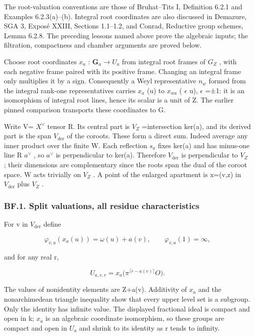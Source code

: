 \documentclass[
  11pt,
]{article}
\begin{document}
The root-valuation conventions are those of Bruhat--Tits I, Definition
6.2.1 and Examples 6.2.3(a)--(b). Integral root coordinates are also
discussed in Demazure, SGA 3, Exposé XXIII, Sections 1.1--1.2, and
Conrad, Reductive group schemes, Lemma 6.2.8. The preceding lessons
named above prove the algebraic inputs; the filtration, compactness and
chamber arguments are proved below.

Choose root coordinates \(x_{a}\) : \(\mathbf G_{a} \to U_{a}\) from
integral root frames of \(G_{Z}\) , with each negative frame paired with
its positive frame. Changing an integral frame only multiplies it by a
sign. Consequently a Weyl representative \(n_{w}\) formed from the
integral rank-one representatives carries \(x_{a}\) (u) to \(x_{wa}\) (
\(\epsilon\) u), \(\epsilon\) =±1: it is an isomorphism of integral root
lines, hence its scalar is a unit of Z. The earlier pinned comparison
transports these coordinates to G.

Write V= \(X^\vee\) tensor R. Its central part is \(V_{Z}\)
=intersection ker(a), and its derived part is the span
\(V_{\mathrm{der}}\) of the coroots. These form a direct sum. Indeed
average any inner product over the finite W. Each reflection \(s_{a}\)
fixes ker(a) and has minus-one line R \(a^\vee\) , so \(a^\vee\) is
perpendicular to ker(a). Therefore \(V_{\mathrm{der}}\) is perpendicular
to \(V_{Z}\) ; their dimensions are complementary since the roots span
the dual of the coroot space. W acts trivially on \(V_{Z}\) . A point of
the enlarged apartment is x=(v,z) in \(V_{\mathrm{der}}\) plus \(V_{Z}\)
.

\subsubsection{BF.1. Split valuations, all residue
characteristics}\label{bf.1.-split-valuations-all-residue-characteristics}

For v in \(V_{\mathrm{der}}\) define

\[
 \varphi_{v,a}(x_a(u))=\omega(u)+a(v),\qquad
 \varphi_{v,a}(1)=\infty,
\]

and for any real r,

\[
 U_{a,v,r}=x_a\bigl(\pi^{\lceil r-a(v)\rceil}O\bigr).
 \tag{BF.1}
\]

The values of nonidentity elements are Z+a(v). Additivity of \(x_{a}\)
and the nonarchimedean triangle inequality show that every upper level
set is a subgroup. Only the identity has infinite value. The displayed
fractional ideal is compact and open in k; \(x_{a}\) is an algebraic
coordinate isomorphism, so these groups are compact and open in
\(U_{a}\) and shrink to its identity as r tends to infinity.
\end{document}

